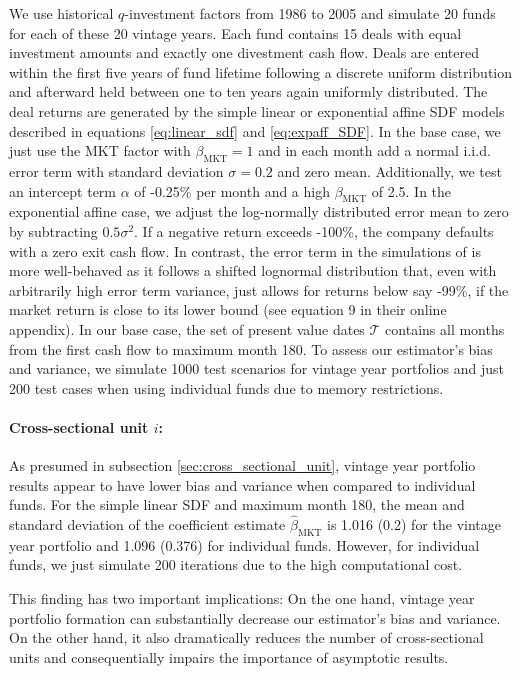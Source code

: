 \documentclass[12pt]{article}
\begin{document}
We use historical $q$-investment factors from 1986 to 2005 and simulate 20 funds for each of these 20 vintage years.
Each fund contains 15 deals with equal investment amounts and exactly one divestment cash flow.
Deals are entered within the first five years of fund lifetime following a discrete uniform distribution and afterward held between one to ten years again uniformly distributed.
The deal returns are generated by the simple linear or exponential affine SDF models described in equations \ref{eq:linear_sdf} and \ref{eq:expaff_SDF}.
In the base case, we just use the MKT factor with $\beta_{\mathrm{MKT}}=1$ and in each month add a normal i.i.d. error term with standard deviation $\sigma=0.2$ and zero mean.
Additionally, we test an intercept term $\alpha$ of -0.25\% per month and a high $\beta_{\mathrm{MKT}}$ of 2.5.
In the exponential affine case, we adjust the log-normally distributed error mean to zero by subtracting $0.5 \sigma^2$.
If a negative return exceeds -100\%, the company defaults with a zero exit cash flow.
In contrast, the error term in the simulations of \cite{DLP12} is more well-behaved as it follows a shifted lognormal distribution that, even with arbitrarily high error term variance, just allows for returns below say -99\%, if the market return is close to its lower bound (see equation 9 in their online appendix).
In our base case, the set of present value dates $\mathcal{T}$ contains all months from the first cash flow to maximum month 180.
To assess our estimator's bias and variance, we simulate 1000 test scenarios for vintage year portfolios and just 200 test cases when using individual funds due to memory restrictions.


\paragraph{Cross-sectional unit $i$:}
As presumed in subsection \ref{sec:cross_sectional_unit}, vintage year portfolio results appear to have lower bias and variance when compared to individual funds.
For the simple linear SDF and maximum month 180, the mean and standard deviation of the coefficient estimate $\hat{\beta}_{\mathrm{MKT}}$ is 1.016 (0.2) for the vintage year portfolio and 1.096 (0.376) for individual funds. However, for individual funds, we just simulate 200 iterations due to the high computational cost.

This finding has two important implications:
On the one hand, vintage year portfolio formation can substantially decrease our estimator's bias and variance.
On the other hand, it also dramatically reduces the number of cross-sectional units and consequentially impairs the importance of asymptotic results.
\end{document}
